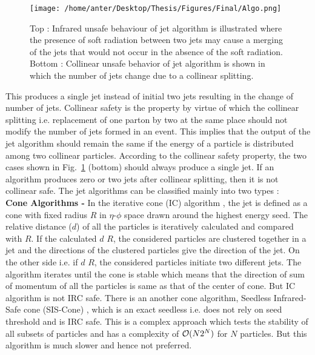 \begin{figure}[h!]
\begin{center} 
\texttt{[image: /home/anter/Desktop/Thesis/Figures/Final/Algo.png]}\\
\caption[Illustration of infrared and collinear unsafe behaviour of jet algorithms.]{Top : Infrared unsafe behaviour of jet algorithm is illustrated where the presence of soft radiation between two jets may cause a merging of the jets that would not occur in the absence of the soft radiation. Bottom : Collinear unsafe behavior of jet algorithm is shown in which the number of jets change due to a collinear splitting\footnotemark.}
\label{fig:IRC}
\end{center}
\end{figure} This produces a single jet instead of initial two jets resulting in the change of number of jets. Collinear safety is the property by virtue of which the collinear splitting i.e. replacement of one parton by two at the same place should not modify the number of jets formed in an event. This implies that the output of the jet algorithm should remain the same if the energy of a particle is distributed among two collinear particles. According to the collinear safety property, the two cases shown in Fig.~\ref{fig:IRC} (bottom) should always produce a single jet. If an algorithm produces zero or two jets after collinear splitting, then it is not collinear safe. The jet algorithms can be classified mainly into two types : \\ \newline
{\bf Cone Algorithms -} In the iterative cone (IC) algorithm \cite{Blazey:2000qt}, the jet is defined as a cone with fixed radius $R$ in $\eta$-$\phi$ space drawn around the highest energy seed. The relative distance ($d$) of all the particles is iteratively calculated and compared with $R$. If the calculated $d$ \ls $R$, the considered particles are clustered together in a jet and the directions of the clustered particles give the direction of the jet. On the other side i.e. if $d$ \gr $R$, the considered particles initiate two different jets. The algorithm iterates until the cone is stable which means that the direction of sum of momentum of all the particles is same as that of the center of cone. But IC algorithm is not IRC safe. There is an another cone algorithm, Seedless Infrared-Safe cone (SIS-Cone) \cite{Weinzierl:2011jx}, which is an exact seedless i.e. does not rely on seed threshold and is IRC safe. This is a complex approach which tests the stability of all subsets of particles and has a complexity of ${\cal O}(N2^{N})$ for $N$ particles. But this algorithm is much slower and hence not preferred. \\ \newline
